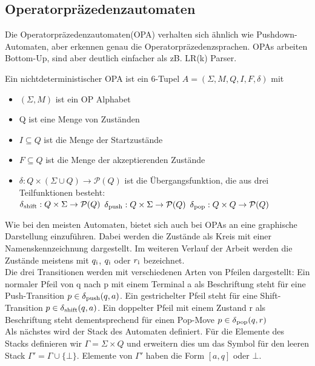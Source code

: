 \subsection{Operatorpräzedenzautomaten}
Die Operatorpräzedenzautomaten(OPA) verhalten sich ähnlich wie Pushdown-Automaten, aber erkennen genau die Operatorpräzedenzsprachen. OPAs arbeiten Bottom-Up, sind aber deutlich einfacher als zB. LR(k) Parser.
\begin{definition}[Operatorpräzedenzautomat]
Ein nichtdeterministischer OPA ist ein 6-Tupel $A=(\Sigma, M, Q, I, F, \delta)$ mit
	\begin{itemize}
	\item
	$(\Sigma, M)$ ist ein OP Alphabet
	\item 
	Q ist eine Menge von Zuständen
	\item
	$I \subseteq Q$ ist die Menge der Startzustände
	\item
	$F \subseteq Q$ ist die Menge der akzeptierenden Zustände
	\item
	$\delta: Q \times (\Sigma \cup Q) \rightarrow \mathcal{P}(Q)$ ist die Übergangsfunktion, die aus drei Teilfunktionen besteht:\\
	$\delta \textsubscript{shift}: Q \times \Sigma \rightarrow \mathcal{P}(Q)$
	$\delta \textsubscript{push}: Q \times \Sigma \rightarrow \mathcal{P}(Q)$
	$\delta \textsubscript{pop}: Q \times Q \rightarrow \mathcal{P}(Q)$
	\end{itemize}
\end{definition}
Wie bei den meisten Automaten, bietet sich auch bei OPAs an eine graphische Darstellung einzuführen. Dabei werden die Zustände als Kreis mit einer Namenskennzeichnung dargestellt. Im weiteren Verlauf der Arbeit werden die Zustände meistens mit $q \textsubscript{i}$, $q \textsubscript{i}$ oder $r \textsubscript{i}$ bezeichnet. \\
Die drei Transitionen werden mit verschiedenen Arten von Pfeilen dargestellt: Ein normaler Pfeil von q nach p mit einem Terminal a als Beschriftung steht für eine Push-Transition $p \in \delta \textsubscript{push}(q, a)$. Ein gestrichelter Pfeil steht für eine Shift-Transition $p \in \delta \textsubscript{shift}(q, a)$. Ein doppelter Pfeil mit einem Zustand r als Beschriftung steht dementsprechend für einen Pop-Move $p \in \delta \textsubscript{pop}(q, r)$\\
Als nächstes wird der Stack des Automaten definiert. Für die Elemente des Stacks definieren wir $\Gamma = \Sigma \times Q$ und erweitern dies um das Symbol für den leeren Stack $\Gamma ' = \Gamma \cup \{\bot\}$. Elemente von $\Gamma'$ haben die Form $\left[a, q\right]$ oder $\bot$.\\
